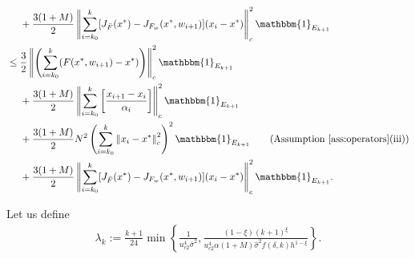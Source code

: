 \documentclass[letterpaper, 10 pt]{article}
\begin{document}
\begin{align*}
    &\quad~+ \frac{3(1+M)}{2} \left\|\sum\limits_{i=k_0}^{k} [J_{\bar{F}}(x^*)-J_{F_w}(x^*,w_{i+1})](x_i-x^*) \right\|^2_c \mathbbm{1}_{E_{k+1}}\\
    &\leq  \frac{3}{2}\left\| \left(\sum\limits_{i=k_0}^{k}   (F(x^*,w_{i+1})-x^*) \right)\right\|^2_c \mathbbm{1}_{E_{k+1}}\\
    &\quad~+\frac{3(1+M)}{2} \left\| \sum\limits_{i=k_0}^{k} \left[\frac{x_{i+1}-x_i}{\alpha_i}  \right]\right\|^2_c\mathbbm{1}_{E_{k+1}}\\
    &\quad~+ \frac{3(1+M)}{2}N^2\left( \sum\limits_{i=k_0}^{k}\left\|x_i-x^*\right\|_c^2\right)^2\mathbbm{1}_{E_{k+1}}\tag{Assumption \ref{ass:operators}(iii)}\\
    &\quad~+ \frac{3(1+M)}{2} \left\|\sum\limits_{i=k_0}^{k} [J_{\bar{F}}(x^*)-J_{F_w}(x^*,w_{i+1})](x_i-x^*) \right\|^2_c\mathbbm{1}_{E_{k+1}}. 
\end{align*}

Let us define 
\begin{align*}
    \lambda_k :=\frac{k+1}{24} \min\left\{ \frac{1}{u_{c2}^4\bar{\sigma}^2}, \frac{(1-\xi)(k+1)^\xi}{u_{c2}^4\alpha (1+M)\hat{\sigma}^2f(\delta,k)h^{1-\xi}} \right\}.
\end{align*}
\end{document}
